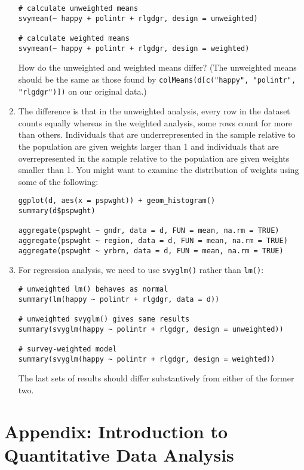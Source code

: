 \documentclass[a4paper,12pt]{article}
\begin{document}
\begin{enumerate}
\begin{verbatim}
# calculate unweighted means
svymean(~ happy + polintr + rlgdgr, design = unweighted)

# calculate weighted means
svymean(~ happy + polintr + rlgdgr, design = weighted)
\end{verbatim}

\noindent How do the unweighted and weighted means differ? (The unweighted means should be the same as those found by \texttt{colMeans(d[c("happy", "polintr", "rlgdgr")])} on our original data.)

\item The difference is that in the unweighted analysis, every row in the dataset counts equally whereas in the weighted analysis, some rows count for more than others. Individuals that are underrepresented in the sample relative to the population are given weights larger than 1 and individuals that are overrepresented in the sample relative to the population are given weights smaller than 1. You might want to examine the distribution of weights using some of the following:

\begin{verbatim}
ggplot(d, aes(x = pspwght)) + geom_histogram()
summary(d$pspwght)

aggregate(pspwght ~ gndr, data = d, FUN = mean, na.rm = TRUE)
aggregate(pspwght ~ region, data = d, FUN = mean, na.rm = TRUE)
aggregate(pspwght ~ yrbrn, data = d, FUN = mean, na.rm = TRUE)
\end{verbatim}

\item For regression analysis, we need to use \texttt{svyglm()} rather than \texttt{lm()}:

\begin{verbatim}
# unweighted lm() behaves as normal
summary(lm(happy ~ polintr + rlgdgr, data = d))

# unweighted svyglm() gives same results
summary(svyglm(happy ~ polintr + rlgdgr, design = unweighted))

# survey-weighted model
summary(svyglm(happy ~ polintr + rlgdgr, design = weighted))
\end{verbatim}

\noindent The last sets of results should differ substantively from either of the former two.

\end{enumerate}


\clearpage

\section{Appendix: Introduction to Quantitative Data Analysis}
\end{document}
